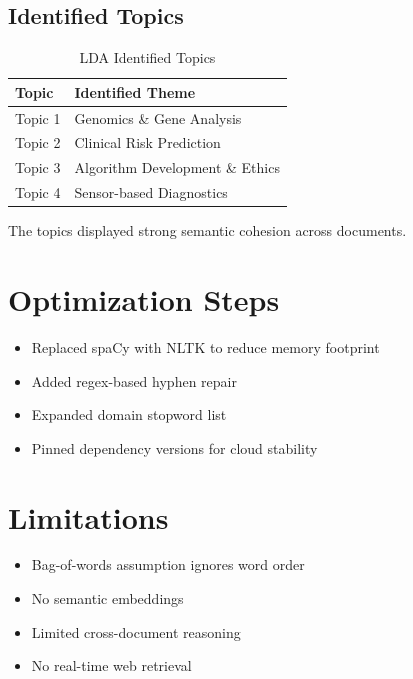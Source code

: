 \documentclass[12pt]{article}
\begin{document}
\subsection{Identified Topics}

\begin{table}[H]
\centering
\begin{tabular}{ll}
\toprule
\textbf{Topic} & \textbf{Identified Theme} \\
\midrule
Topic 1 & Genomics \& Gene Analysis \\
Topic 2 & Clinical Risk Prediction \\
Topic 3 & Algorithm Development \& Ethics \\
Topic 4 & Sensor-based Diagnostics \\
\bottomrule
\end{tabular}
\caption{LDA Identified Topics}
\end{table}

The topics displayed strong semantic cohesion across documents.

\section{Optimization Steps}

\begin{itemize}
    \item Replaced spaCy with NLTK to reduce memory footprint
    \item Added regex-based hyphen repair
    \item Expanded domain stopword list
    \item Pinned dependency versions for cloud stability
\end{itemize}

\section{Limitations}

\begin{itemize}
    \item Bag-of-words assumption ignores word order
    \item No semantic embeddings
    \item Limited cross-document reasoning
    \item No real-time web retrieval
\end{itemize}
\end{document}
